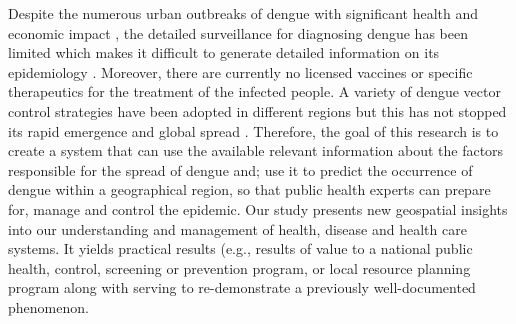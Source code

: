 \documentclass{bmcart}
\begin{document}
Despite the numerous urban outbreaks of dengue with significant health and economic impact \cite{gubler2002epidemic,gubler2004cities,anuradha19981996,vaughn2000invited}, the detailed surveillance for diagnosing dengue has been limited which makes it difficult to generate detailed information on its epidemiology \cite{ooi2009dengue,guzman2004dengue}. Moreover, there are currently no licensed vaccines or specific therapeutics for the treatment of the infected people. A variety of dengue vector control strategies have been adopted in different regions \cite{erlanger2008effect,horstick2010dengue,vanlerberghe2009community,luz2011dengue} but this has not stopped its rapid emergence and global spread \cite{tatem2006global}. Therefore, the goal of this research is to create a system that can use the available relevant information about the factors responsible for the spread of dengue and; use it to predict the occurrence of dengue within a geographical region, so that public health experts can prepare for, manage and control the epidemic. Our study presents new geospatial insights into our understanding and management of health, disease and health care systems. It yields practical results (e.g., results of value to a national public health, control, screening or prevention program, or local resource planning program along with serving to re-demonstrate a previously well-documented phenomenon. 











%
%
%





% 
\end{document}
